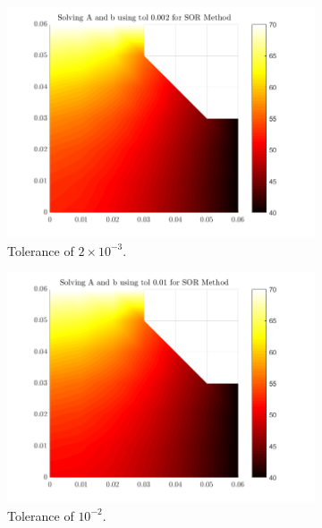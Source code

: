 \documentclass[12pt,a4paper]{article}
\begin{document}
\begin{figure}[H]
\begin{subfigure}[b]{0.48\textwidth}
		\includegraphics[width=\linewidth]{images/SORComparisontol0-002.png}
		\caption{Tolerance of $2 \times 10^{-3}$.}
		\label{fig:SORtol0.002}
	\end{subfigure}
	\hfill
	\begin{subfigure}[b]{0.48\textwidth}
		\centering
		\includegraphics[width=\linewidth]{images/SORComparisontol0-01.png}
		\caption{Tolerance of $10^{-2}$.}
		\label{fig:SORtol0.01}
	\end{subfigure}
	\hfill
	\begin{subfigure}[b]{0.48\textwidth}
		\centering

\end{subfigure}
\end{figure}
\end{document}
